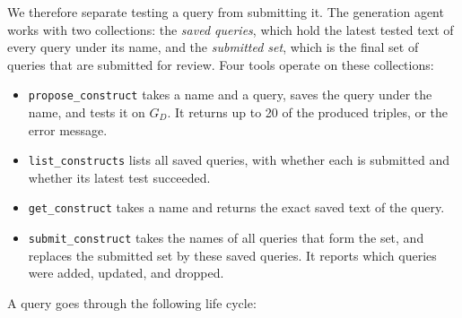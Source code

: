We therefore separate testing a query from submitting it. The generation agent works with two collections: the \emph{saved queries}, which hold the latest tested text of every query under its name, and the \emph{submitted set}, which is the final set of queries that are submitted for review. Four tools operate on these collections:
\begin{itemize}[leftmargin=*, itemsep=2pt]
  \item \texttt{propose\_construct} takes a name and a query, saves the query under the name, and tests it on \(G_D\). It returns up to 20 of the produced triples, or the error message.
  \item \texttt{list\_constructs} lists all saved queries, with whether each is submitted and whether its latest test succeeded.
  \item \texttt{get\_construct} takes a name and returns the exact saved text of the query.
  \item \texttt{submit\_construct} takes the names of all queries that form the set, and replaces the submitted set by these saved queries. It reports which queries were added, updated, and dropped.
\end{itemize}
A query goes through the following life cycle:
